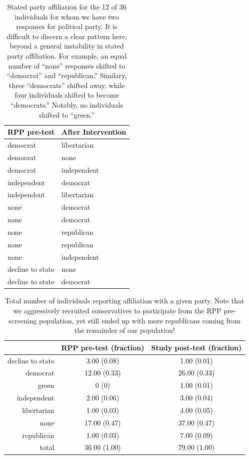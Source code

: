 \begin{table}[ht]
\centering
\caption{Stated party affiliation for the 12 of 36 individuals for whom we have
    two responses for political party. It is difficult to discern a clear
    pattern here, beyond a general instability in stated party affiliation. For
    example, an equal number of “none” responses shifted to “democrat” and
    “republican.” Similary, three “democrats” shifted away, while four
    individuals shifted to become “democrats.” Notably, no individuals shifted
    to “green.”}
\label{table:mech-rpp-party-shifts}
\begin{tabular}{ll}
  \toprule
 RPP pre-test & After Intervention \\ 
  \midrule
   democrat & libertarian \\ 
   democrat & none \\ 
   democrat & independent \\ 
   independent & democrat \\ 
   independent & libertarian \\ 
   none & democrat \\ 
   none & democrat \\ 
   none & republican \\ 
   none & republican \\ 
   none & independent \\ 
   decline to state & none \\ 
   decline to state & democrat \\ 
   \bottomrule
\end{tabular}
\end{table}

\begin{table}[ht]
    \caption{Total number of individuals reporting affiliation with a given
        party. Note that we aggressively recruited conservatives to participate
        from the RPP pre-screening population, yet still ended up with more
        republicans coming from the remainder of our population!}
    \label{table:mech-rpp-party-affiliations}
\centering
\begin{tabular}{rcc}
  \toprule
 & RPP pre-test (fraction) & Study post-test (fraction) \\ 
  \midrule
  decline to state & 3.00 (0.08) & 1.00 (0.01) \\ 
  democrat & 12.00 (0.33) & 26.00 (0.33) \\ 
  green & 0 (0) & 1.00 (0.01) \\ 
  independent & 2.00 (0.06) & 3.00 (0.04) \\ 
  libertarian & 1.00 (0.03) & 4.00 (0.05) \\ 
  none & 17.00 (0.47) & 37.00 (0.47) \\ 
  republican & 1.00 (0.03) & 7.00 (0.09) \\ 
  \midrule
  total & 36.00 (1.00) & 79.00 (1.00) \\ 
   \bottomrule
\end{tabular}
\end{table}

